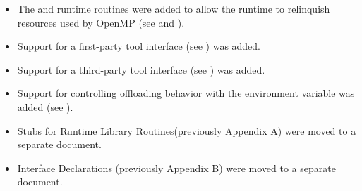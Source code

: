 \begin{itemize}
\item The  and  
      runtime routines were added to allow the runtime to relinquish 
      resources used by OpenMP (see 
      and ).

\item Support for a first-party tool interface
      (see ) was added.

\item Support for a third-party tool interface
      (see ) was added.

\item Support for controlling offloading behavior with the
       environment variable was added
      (see  ).      
      
\item Stubs for Runtime Library Routines(previously Appendix A) 
      were moved to a separate document.
      
\item Interface Declarations (previously Appendix B) were moved 
      to a separate document.
\end{itemize}



